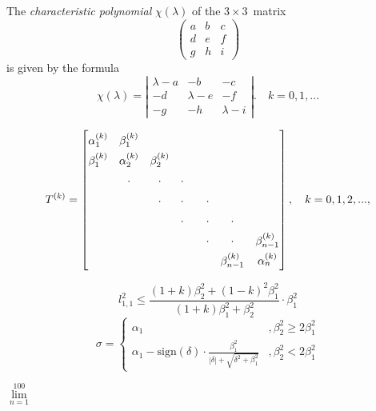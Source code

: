 \documentclass{article}
\begin{document}
The \emph{characteristic polynomial} $\chi(\lambda)$ of the
$3 \times 3$~matrix
\[ \left( \begin{array}{ccc}
a & b & c \\
d & e & f \\
g & h & i \end{array} \right)\] 
is given by the formula
\[ \chi(\lambda) = \left| \begin{array}{ccc}
\lambda - a & -b & -c \\
-d & \lambda - e & -f \\
-g & -h & \lambda - i \end{array} \right|. \hspace{1em}k = 0,1, ...\]

\[
T^{(k)} = 
\renewcommand\arraystretch{1.5}
\begin{bmatrix}
\alpha_1^{(k)} & \beta_1^{(k)} & & & & & \\
\beta_1^{(k)}  & \alpha_2^{(k)} & \beta_2^{(k)} & & & & \\
              & \mathord{\cdot} & \mathord{\cdot} & \mathord{\cdot} & && & \\
              &                 & \mathord{\cdot} & \mathord{\cdot} & &\mathord{\cdot} & & \\
              &                 &                 & \mathord{\cdot} & &\mathord{\cdot} & \mathord{\cdot} & \\
              &                 &                 &                 & &\mathord{\cdot} & \mathord{\cdot} &
              \beta_{n-1}^{(k)} \\
              &                 &                 &                 & &               & \beta_{n-1}^{(k)} & \alpha_n^{(k)}
\end{bmatrix}, \hspace{1em} k = 0,1,2,...,
\]

\[
l_{1,1}^2 \leq \frac{(1+k)\beta_2^2 + (1-k)^2\beta_1^2}{(1+k)\beta_1^2
  + \beta_2^2} \cdot \beta_1^2
\]
\[
\sigma =
\begin{cases}
\alpha_1 & , \beta_2^2 \geq 2\beta_1^2 \\
\alpha_1 - \mathrm{sign}(\delta) \cdot
\frac{\beta_1^2}{\left\lvert\delta\right\rvert + \sqrt{\delta^2 +
    \beta_1^2}} & , \beta_2^2 < 2\beta_1^2
\end{cases}
\]

$\lim \limits_{n=1}^{100}$
\end{document}
